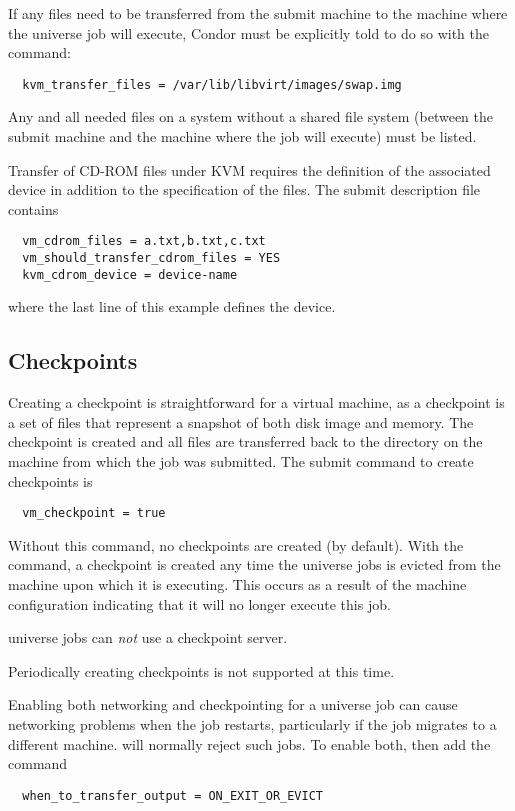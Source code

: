 If any files need to be transferred from the submit machine
to the machine where the  universe job will execute,
Condor must be explicitly told to do so with the
 command:
\footnotesize
\begin{verbatim}
  kvm_transfer_files = /var/lib/libvirt/images/swap.img
\end{verbatim}
\normalsize
Any and all needed files on a system without a shared file
system (between the submit machine and the machine where the
job will execute) must be listed.

Transfer of CD-ROM files under KVM requires the definition of
the associated device in addition to the specification of the
files.
The submit description file contains
\begin{verbatim}
  vm_cdrom_files = a.txt,b.txt,c.txt
  vm_should_transfer_cdrom_files = YES
  kvm_cdrom_device = device-name
\end{verbatim}
where the last line of this example defines the device.

\subsection{\label{sec:vm-checkpoints}Checkpoints}

Creating a checkpoint is straightforward for a virtual machine,
as a checkpoint is a set of files that represent
a snapshot of both disk image and memory.
The checkpoint is created and all files are transferred back
to the  directory on the machine from which
the job was submitted.
The submit command to create checkpoints is
\begin{verbatim}
  vm_checkpoint = true
\end{verbatim}
Without this command, no checkpoints are created (by default).
With the command, a checkpoint is created any time the 
universe jobs is evicted from the machine upon which it is executing.
This occurs as a result of the machine configuration indicating
that it will no longer execute this job.

 universe jobs can \emph{not} use a checkpoint server.

Periodically creating checkpoints is not supported at this time.

Enabling both networking and checkpointing for a 
universe job can cause networking problems when the job restarts,
particularly if the job migrates to a different machine.
 will normally reject such jobs.
To enable both, then add the command
\begin{verbatim}
  when_to_transfer_output = ON_EXIT_OR_EVICT
\end{verbatim}


